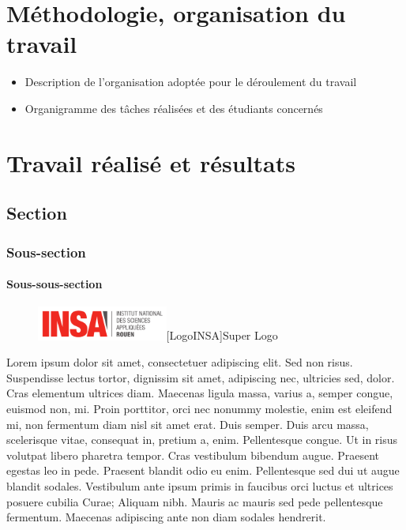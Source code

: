 \documentclass[a4paper, 12pt]{report} %
\begin{document}
	\chapter{Méthodologie, organisation du travail}

	\begin{itemize}
	\item Description de l’organisation adoptée pour le déroulement du travail
	\item Organigramme des tâches réalisées et des étudiants concernés
	\end{itemize}

	\chapter{Travail réalisé et résultats}

		\section{Section}

			\subsection{Sous-section}

				\subsubsection{Sous-sous-section}


\begin{figure}[h]
\centering
\vspace{-0.6cm} 
\includegraphics[width=43mm]{Images/Logo INSA.png}[LogoINSA]{Super Logo}
\end{figure}



	Lorem ipsum dolor sit amet, consectetuer adipiscing elit. Sed non risus. Suspendisse lectus tortor, dignissim sit amet, adipiscing nec, ultricies sed, dolor. Cras elementum ultrices diam. Maecenas ligula massa, varius a, semper congue, euismod non, mi. Proin porttitor, orci nec nonummy molestie, enim est eleifend mi, non fermentum diam nisl sit amet erat. Duis semper. Duis arcu massa, scelerisque vitae, consequat in, pretium a, enim. Pellentesque congue. Ut in risus volutpat libero pharetra tempor. Cras vestibulum bibendum augue. Praesent egestas leo in pede. Praesent blandit odio eu enim. Pellentesque sed dui ut augue blandit sodales. Vestibulum ante ipsum primis in faucibus orci luctus et ultrices posuere cubilia Curae; Aliquam nibh. Mauris ac mauris sed pede pellentesque fermentum. Maecenas adipiscing ante non diam sodales hendrerit.\\
\end{document}
